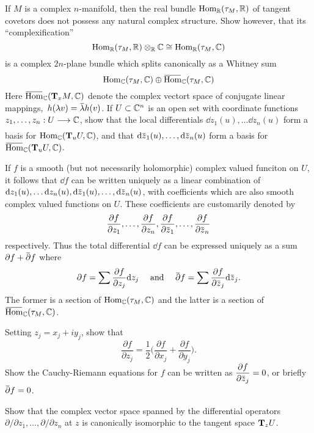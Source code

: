 \documentclass[../main]{subfiles}
\begin{document}
\begin{problem}\label{prob:13.F}
If $M$ is a complex $n$-manifold, then the real bundle $\Hom_\bR(\tangentbundle{M},\bR)$ of  tangent covetors does not possess any natural complex structure. Show however, that its ``complexification''
\[\Hom_\bR(\tangentbundle{M},\bR)\otimes_\bR \bC\cong \Hom_\bR(\tangentbundle{M},\bC)\]
is a complex $2n$-plane bundle which splits canonically as a Whitney sum
\[\Hom_\bC(\tangentbundle{M},\bC) \oplus \xoverline{\Hom}_\bC(\tangentbundle{M},\bC)\]
Here $\xoverline{\Hom}_\bC(\tangentspace{M}{x},\bC)$ denote the complex vectort space of conjugate linear mappings, $\,h(\lambda v)=\xoverline{\lambda} h(v)$. If $U\subset \bC^n$ is an open set with coordinate functions $z_1,\dots,z_n:U\varrightarrow{} \bC$, show that the local differentials $\dd z_1(u),\dots \dd z_n(u)$ form a basis for $\Hom_\bC(\tangentspace{U}{u},\bC)$, and that $\dd\xoverline{z}_1(u),\dots,\dd \xoverline{z}_n(u)$ form a basis for $\xoverline{\Hom}_\bC(\tangentspace{U}{u} , \bC)$.

If $f$ is a smooth (but not necessarily holomorphic) complex valued funciton on $U$, it follows that $\dd f$ can be written uniquely as a linear combination of $\dd z_1(u),\dots \dd z_n(u),\dd\xoverline{z}_1(u),\dots,\dd \xoverline{z}_n(u)$, with coefficients which are also smooth complex valued functions on $U$. These coefficients are customarily denoted by 
\[\dfrac{\partial f}{\partial z_1}, \dots, \dfrac{\partial f}{\partial z_n},\dfrac{\partial f}{\partial \xoverline{z}_1},\dots,\dfrac{ \partial f}{\partial \xoverline{z}_n}\]
respectively. Thus the total differential $\dd{f}$ can be expressed uniquely as a sum $\partial f +\xoverline{\partial}f$ where 
\[\partial f = \sum \dfrac{\partial f}{\partial z_j}\dd z_j \quad \text{ and }\quad \xoverline{\partial}f = \sum \dfrac{ \partial f}{\partial \xoverline{z}_j}\dd{\xoverline{z}_j}.\]
The former is a section of $\Hom_\bC(\tangentbundle{M},\bC)$ and the latter is a section of $\xoverline{\Hom}_\bC(\tangentbundle{M},\bC)$. 

Setting $z_j = x_j+iy_j$, show that \[\dfrac{\partial f}{\partial z_j}=\dfrac{1}{2}\bigg(\dfrac{\partial f}{\partial x_j}+\dfrac{\partial f}{\partial y_j}\bigg).\] Show the Cauchy-Riemann equations for $f$ can be written as $\dfrac{\partial f}{\partial \xoverline{z}_j}=0$, or briefly $\xoverline{\partial}f=0$.
\end{problem}

\begin{problem}
\label{prob:13.G} Show that the complex vector space spanned by the differential operators $\partial/\partial z_1,\dots, \partial/\partial z_n$ at $z$ is canonically isomorphic to the tangent space $\tangentspace{U}{z}$.
\end{problem}
\end{document}
